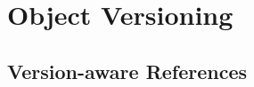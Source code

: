 

\chapter{Object Versioning} \label{chapter:APPROACH}

% 
% 


\section{Version-aware References} \label{sec:APPROACH:1}



